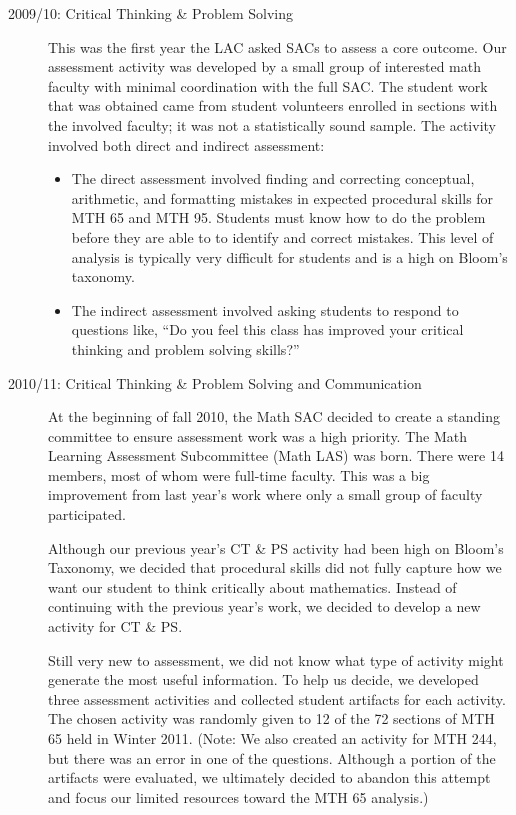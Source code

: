 \begin{description}
\item [2009/10: Critical Thinking  \& Problem Solving]

This was the first year the LAC asked SACs to assess a core outcome. Our assessment activity was developed by a small group of interested math faculty with minimal coordination with the full SAC. The student work that was obtained came from student volunteers enrolled in sections with the involved faculty; it was not a statistically sound sample.  The activity involved both direct and indirect assessment: 
\begin{itemize}
\item The direct assessment involved finding and correcting conceptual, arithmetic, and formatting mistakes in expected procedural skills for MTH 65 and MTH 95. Students must know how to do the problem before they are able to to identify and correct mistakes. This level of analysis is typically very difficult for students and is a high on Bloom's taxonomy.

\item The indirect assessment involved asking students to respond to questions like, ``Do you feel this class has improved your critical thinking and problem solving skills?''
\end{itemize}

\item[2010/11:  Critical Thinking \& Problem Solving and Communication]

At the beginning of fall 2010, the Math SAC decided to create a standing committee to ensure assessment work was a high priority. The Math Learning Assessment Subcommittee (Math LAS) was born.  There were 14 members, most of whom were full-time faculty. This was a big improvement from last year's work where only a small group of faculty participated.

Although our previous year's CT \& PS activity had been high on Bloom's Taxonomy, we decided that procedural skills did not fully capture how we want our student to think critically about mathematics.  Instead of continuing with the previous year's work, we decided to develop a new activity for CT \& PS. 

Still very new to assessment, we did not know what type of activity might generate the most useful information.  To help us decide, we developed three assessment activities and collected student artifacts for each activity.  The chosen activity was randomly given to 12 of the 72 sections of MTH 65 held in Winter 2011.  (Note: We also created an activity for MTH 244, but there was an error in one of the questions.  Although a portion of the artifacts were evaluated, we ultimately decided to abandon this attempt and focus our limited resources toward the MTH 65 analysis.)


\end{description}

